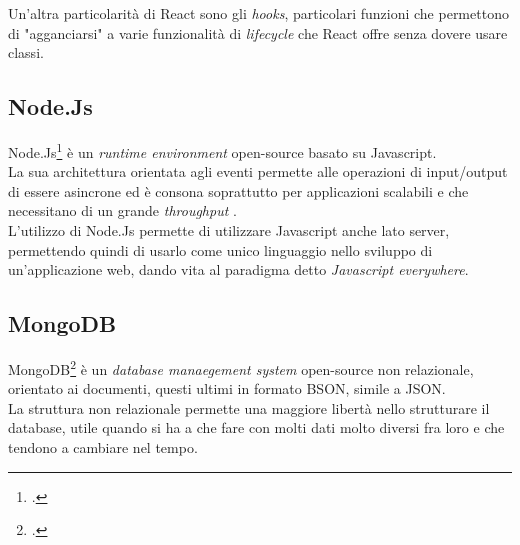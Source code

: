 Un'altra particolarità di React sono gli \emph{hooks}, particolari funzioni che permettono di "agganciarsi" a varie funzionalità di \emph{lifecycle} che React offre senza dovere usare classi.

\subsection{Node.Js}

Node.Js\footcite{site:node.js} è un \emph{runtime environment} open-source basato su Javascript.\\
La sua architettura orientata agli eventi permette alle operazioni di input/output di essere asincrone ed è consona soprattutto per applicazioni scalabili e che necessitano di un grande \emph{throughput} .\\
L'utilizzo di Node.Js permette di utilizzare Javascript anche lato server, permettendo quindi di usarlo come unico linguaggio nello sviluppo di un'applicazione web, dando vita al paradigma detto \emph{Javascript everywhere}.\\

\subsection{MongoDB}

MongoDB\footcite{site:mongo} è un \emph{database manaegement system} open-source non relazionale, orientato ai documenti, questi ultimi in formato BSON, simile a JSON.\\
La struttura non relazionale permette una maggiore libertà nello strutturare il database, utile quando si ha a che fare con molti dati molto diversi fra loro e che tendono a cambiare nel tempo.